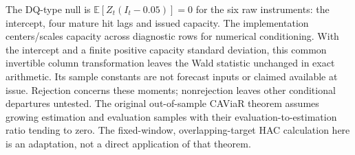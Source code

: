 \documentclass[11pt,a4paper]{article}
\begin{document}
The DQ-type null is \(\mathbb E[Z_t(I_t-0.05)]=0\) for the six raw instruments: the intercept, four mature hit lags and issued capacity. The implementation centers/scales capacity across diagnostic rows for numerical conditioning. With the intercept and a finite positive capacity standard deviation, this common invertible column transformation leaves the Wald statistic unchanged in exact arithmetic. Its sample constants are not forecast inputs or claimed available at issue. Rejection concerns these moments; nonrejection leaves other conditional departures untested. The original out-of-sample CAViaR theorem assumes growing estimation and evaluation samples with their evaluation-to-estimation ratio tending to zero. The fixed-window, overlapping-target HAC calculation here is an adaptation, not a direct application of that theorem.
\end{document}
